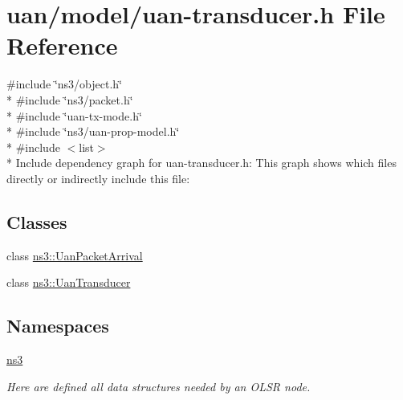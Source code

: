 \hypertarget{uan-transducer_8h}{}\section{uan/model/uan-\/transducer.h File Reference}
\label{uan-transducer_8h}
{\ttfamily \#include \char`\"{}ns3/object.\+h\char`\"{}}\\*
{\ttfamily \#include \char`\"{}ns3/packet.\+h\char`\"{}}\\*
{\ttfamily \#include \char`\"{}uan-\/tx-\/mode.\+h\char`\"{}}\\*
{\ttfamily \#include \char`\"{}ns3/uan-\/prop-\/model.\+h\char`\"{}}\\*
{\ttfamily \#include $<$list$>$}\\*
Include dependency graph for uan-\/transducer.h\+:
This graph shows which files directly or indirectly include this file\+:
\subsection*{Classes}
\begin{DoxyCompactItemize}
\item 
class \hyperlink{classns3_1_1UanPacketArrival}{ns3\+::\+Uan\+Packet\+Arrival}
\item 
class \hyperlink{classns3_1_1UanTransducer}{ns3\+::\+Uan\+Transducer}
\end{DoxyCompactItemize}
\subsection*{Namespaces}
\begin{DoxyCompactItemize}
\item 
 \hyperlink{namespacens3}{ns3}
\begin{DoxyCompactList}\small\item\em Here are defined all data structures needed by an O\+L\+SR node. \end{DoxyCompactList}\end{DoxyCompactItemize}
